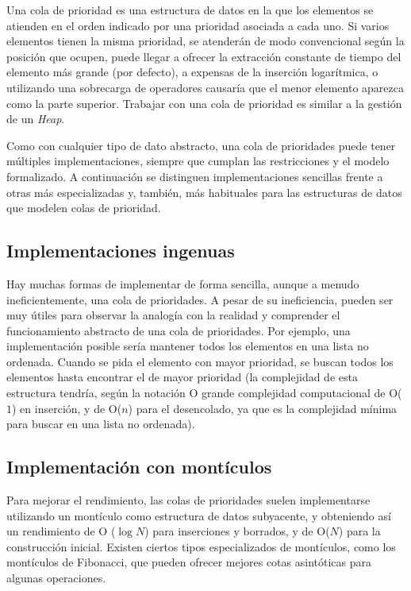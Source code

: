 Una cola de prioridad es una estructura de datos en la que los elementos se atienden en el orden
indicado por una prioridad asociada a cada uno. Si varios elementos tienen la misma prioridad, se
atenderán de modo convencional según la posición que ocupen, puede llegar a ofrecer la extracción
constante de tiempo del elemento más grande (por defecto), a expensas de la inserción logarítmica, o
utilizando una sobrecarga de operadores causaría que el menor elemento aparezca como la parte superior.
Trabajar con una cola de prioridad es similar a la gestión de un \emph{Heap}.

Como con cualquier tipo de dato abstracto, una cola de prioridades puede tener múltiples implementaciones, siempre que cumplan las restricciones y el modelo formalizado. A continuación se distinguen implementaciones sencillas frente a otras más especializadas y, también, más habituales para las estructuras de datos que modelen colas de prioridad. 

\subsection{Implementaciones ingenuas}

Hay muchas formas de implementar de forma sencilla, aunque a menudo ineficientemente, una cola de prioridades. A pesar de su ineficiencia, pueden ser muy útiles para observar la analogía con la realidad y comprender el funcionamiento abstracto de una cola de prioridades. Por ejemplo, una implementación posible sería mantener todos los elementos en una lista no ordenada. Cuando se pida el elemento con mayor prioridad, se buscan todos los elementos hasta encontrar el de mayor prioridad (la complejidad de esta estructura tendría, según la notación O grande complejidad computacional de O($1$) en inserción, y de O($n$) para el desencolado, ya que es la complejidad mínima para buscar en una lista no ordenada).

\subsection{Implementación con montículos}
Para mejorar el rendimiento, las colas de prioridades suelen implementarse utilizando un montículo como estructura de datos subyacente, y obteniendo así un rendimiento de O ($\log N$) para inserciones y borrados, y de O($N$) para la construcción inicial. Existen ciertos tipos especializados de montículos, como los montículos de Fibonacci, que pueden ofrecer mejores cotas asintóticas para algunas operaciones.

